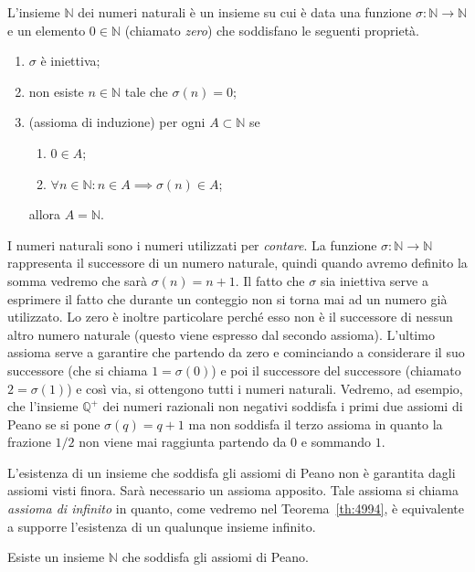 \documentclass[italian,a4paper,hidelinks,headinclude]{scrartcl}
\newcommand{\NN}{{\mathbb N}}
\newcommand{\QQ}{{\mathbb Q}}
\newcommand{\myemph}[1]{\emph{#1}\marginpar{#1}}
\begin{document}
\begin{theorem}
  L'insieme $\NN$ dei numeri naturali è un insieme su cui
  è data una funzione $\sigma\colon \NN\to\NN$ e un
  elemento $0\in \NN$ (chiamato \myemph{zero}) che soddisfano le seguenti proprietà.
  \begin{enumerate}
  \item $\sigma$ è iniettiva;
  \item non esiste $n\in \NN$ tale che $\sigma(n)=0$;
  \item (assioma di induzione)
  per ogni $A\subset \NN$ se
  \begin{enumerate}
     \item $0\in A$;
     \item $\forall n\in \NN \colon n\in A \implies \sigma(n) \in A$;
  \end{enumerate}
  allora $A= \NN$.
  \end{enumerate}
\end{theorem}

I numeri naturali sono i numeri utilizzati per \emph{contare}.
La funzione $\sigma\colon \NN \to \NN$ rappresenta il successore di un numero
naturale, quindi quando avremo definito la somma vedremo che sarà
$\sigma(n)=n+1$.
Il fatto che $\sigma$ sia iniettiva serve a esprimere il fatto che
durante un conteggio non si torna mai ad un numero già utilizzato.
Lo zero è inoltre particolare perché esso non è il successore di nessun altro
numero naturale (questo viene espresso dal secondo assioma).
L'ultimo assioma serve a garantire che partendo da zero e cominciando
a considerare il suo successore (che si chiama $1=\sigma(0)$) e poi il
successore del successore (chiamato $2=\sigma(1)$) e così via, si ottengono
tutti i numeri naturali. Vedremo, ad esempio, che l'insieme $\QQ^+$
dei numeri razionali non negativi
soddisfa i primi due assiomi di Peano se si pone $\sigma(q)=q+1$
ma non soddisfa il terzo assioma in quanto la frazione $1/2$ non viene mai raggiunta
partendo da $0$ e sommando $1$.

L'esistenza di un insieme che soddisfa gli assiomi di Peano non è garantita
dagli assiomi visti finora. Sarà necessario un assioma apposito.
Tale assioma si chiama \emph{assioma di infinito} in quanto, come vedremo
nel Teorema~\ref{th:4994}, è equivalente a supporre l'esistenza di un
qualunque insieme infinito.

\begin{axiom}[di infinito]
  Esiste un insieme $\NN$ che soddisfa gli assiomi di Peano.
\end{axiom}
\end{document}
